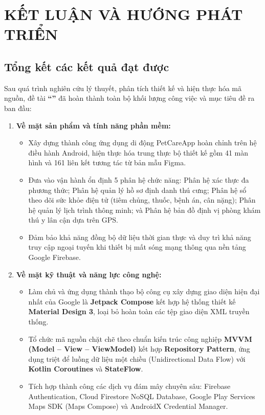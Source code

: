 \chapter{KẾT LUẬN VÀ HƯỚNG PHÁT TRIỂN}
\label{chap:ket_luan_huong_phat_trien}

\section{Tổng kết các kết quả đạt được}
\label{sec:tong_ket_ket_qua}

Sau quá trình nghiên cứu lý thuyết, phân tích thiết kế và hiện thực hóa mã nguồn, đề tài \textbf{``\ProjectTitle''} đã hoàn thành toàn bộ khối lượng công việc và mục tiêu đề ra ban đầu:

\begin{enumerate}
    \item \textbf{Về mặt sản phẩm và tính năng phần mềm:}
    \begin{itemize}
        \item Xây dựng thành công ứng dụng di động PetCareApp hoàn chỉnh trên hệ điều hành Android, hiện thực hóa trung thực bộ thiết kế gồm 41 màn hình và 161 liên kết tương tác từ bản mẫu Figma.
        \item Đưa vào vận hành ổn định 5 phân hệ chức năng: Phân hệ xác thực đa phương thức; Phân hệ quản lý hồ sơ định danh thú cưng; Phân hệ sổ theo dõi sức khỏe điện tử (tiêm chủng, thuốc, bệnh án, cân nặng); Phân hệ quản lý lịch trình thông minh; và Phân hệ bản đồ định vị phòng khám thú y lân cận dựa trên GPS.
        \item Đảm bảo khả năng đồng bộ dữ liệu thời gian thực và duy trì khả năng truy cập ngoại tuyến khi thiết bị mất sóng mạng thông qua nền tảng Google Firebase.
    \end{itemize}

    \item \textbf{Về mặt kỹ thuật và năng lực công nghệ:}
    \begin{itemize}
        \item Làm chủ và ứng dụng thành thạo bộ công cụ xây dựng giao diện hiện đại nhất của Google là \textbf{Jetpack Compose} kết hợp hệ thống thiết kế \textbf{Material Design 3}, loại bỏ hoàn toàn các tệp giao diện XML truyền thống.
        \item Tổ chức mã nguồn chặt chẽ theo chuẩn kiến trúc công nghiệp \textbf{MVVM (Model -- View -- ViewModel)} kết hợp \textbf{Repository Pattern}, ứng dụng triệt để luồng dữ liệu một chiều (Unidirectional Data Flow) với \textbf{Kotlin Coroutines} và \textbf{StateFlow}.
        \item Tích hợp thành công các dịch vụ đám mây chuyên sâu: Firebase Authentication, Cloud Firestore NoSQL Database, Google Play Services Maps SDK (Maps Compose) và AndroidX Credential Manager.
    \end{itemize}
\end{enumerate}

